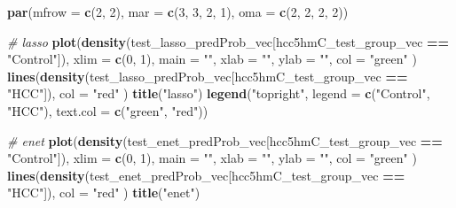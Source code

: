 \documentclass[
]{book}
\newenvironment{Shaded}{\begin{snugshade}}{\end{snugshade}}
\newcommand{\CommentTok}[1]{\textcolor[rgb]{0.56,0.35,0.01}{\textit{#1}}}
\newcommand{\DataTypeTok}[1]{\textcolor[rgb]{0.13,0.29,0.53}{#1}}
\newcommand{\DecValTok}[1]{\textcolor[rgb]{0.00,0.00,0.81}{#1}}
\newcommand{\KeywordTok}[1]{\textcolor[rgb]{0.13,0.29,0.53}{\textbf{#1}}}
\newcommand{\NormalTok}[1]{#1}
\newcommand{\OperatorTok}[1]{\textcolor[rgb]{0.81,0.36,0.00}{\textbf{#1}}}
\newcommand{\StringTok}[1]{\textcolor[rgb]{0.31,0.60,0.02}{#1}}
\begin{document}
\begin{Shaded}
\begin{Highlighting}[]
\KeywordTok{par}\NormalTok{(}\DataTypeTok{mfrow =} \KeywordTok{c}\NormalTok{(}\DecValTok{2}\NormalTok{, }\DecValTok{2}\NormalTok{), }\DataTypeTok{mar =} \KeywordTok{c}\NormalTok{(}\DecValTok{3}\NormalTok{, }\DecValTok{3}\NormalTok{, }\DecValTok{2}\NormalTok{, }\DecValTok{1}\NormalTok{), }\DataTypeTok{oma =} \KeywordTok{c}\NormalTok{(}\DecValTok{2}\NormalTok{, }\DecValTok{2}\NormalTok{, }\DecValTok{2}\NormalTok{, }\DecValTok{2}\NormalTok{))}

\CommentTok{\# lasso}
\KeywordTok{plot}\NormalTok{(}\KeywordTok{density}\NormalTok{(test\_lasso\_predProb\_vec[hcc5hmC\_test\_group\_vec }\OperatorTok{==}\StringTok{ "Control"}\NormalTok{]),}
  \DataTypeTok{xlim =} \KeywordTok{c}\NormalTok{(}\DecValTok{0}\NormalTok{, }\DecValTok{1}\NormalTok{), }\DataTypeTok{main =} \StringTok{""}\NormalTok{, }\DataTypeTok{xlab =} \StringTok{""}\NormalTok{, }\DataTypeTok{ylab =} \StringTok{""}\NormalTok{, }\DataTypeTok{col =} \StringTok{"green"}
\NormalTok{)}
\KeywordTok{lines}\NormalTok{(}\KeywordTok{density}\NormalTok{(test\_lasso\_predProb\_vec[hcc5hmC\_test\_group\_vec }\OperatorTok{==}\StringTok{ "HCC"}\NormalTok{]),}
  \DataTypeTok{col =} \StringTok{"red"}
\NormalTok{)}
\KeywordTok{title}\NormalTok{(}\StringTok{"lasso"}\NormalTok{)}
\KeywordTok{legend}\NormalTok{(}\StringTok{"topright"}\NormalTok{, }\DataTypeTok{legend =} \KeywordTok{c}\NormalTok{(}\StringTok{"Control"}\NormalTok{, }\StringTok{"HCC"}\NormalTok{), }\DataTypeTok{text.col =} \KeywordTok{c}\NormalTok{(}\StringTok{"green"}\NormalTok{, }\StringTok{"red"}\NormalTok{))}

\CommentTok{\# enet}
\KeywordTok{plot}\NormalTok{(}\KeywordTok{density}\NormalTok{(test\_enet\_predProb\_vec[hcc5hmC\_test\_group\_vec }\OperatorTok{==}\StringTok{ "Control"}\NormalTok{]),}
  \DataTypeTok{xlim =} \KeywordTok{c}\NormalTok{(}\DecValTok{0}\NormalTok{, }\DecValTok{1}\NormalTok{), }\DataTypeTok{main =} \StringTok{""}\NormalTok{, }\DataTypeTok{xlab =} \StringTok{""}\NormalTok{, }\DataTypeTok{ylab =} \StringTok{""}\NormalTok{, }\DataTypeTok{col =} \StringTok{"green"}
\NormalTok{)}
\KeywordTok{lines}\NormalTok{(}\KeywordTok{density}\NormalTok{(test\_enet\_predProb\_vec[hcc5hmC\_test\_group\_vec }\OperatorTok{==}\StringTok{ "HCC"}\NormalTok{]),}
  \DataTypeTok{col =} \StringTok{"red"}
\NormalTok{)}
\KeywordTok{title}\NormalTok{(}\StringTok{"enet"}\NormalTok{)}


\end{Highlighting}
\end{Shaded}
\end{document}
